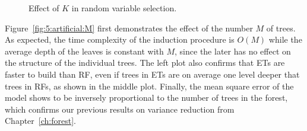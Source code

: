 \begin{figure}
\hspace{-1.75cm}
\caption{Effect of $K$ in random variable selection.}
\label{fig:5:artificial:K}
\end{figure}

Figure~\ref{fig:5:artificial:M} first demonstrates the effect of the number $M$
of trees. As expected, the time complexity of the induction procedure is
$O(M)$ while the average depth of the leaves is constant with $M$, since the
later has no effect on the structure of the individual trees. The left plot
also confirms that ETs are faster to build than RF, even if trees in ETs are on
average one level deeper that trees in RFs, as shown in the middle plot.
Finally, the mean square error of the model shows to be inversely proportional
to the number of trees in the forest, which confirms our previous results on
variance reduction from Chapter~\ref{ch:forest}.

